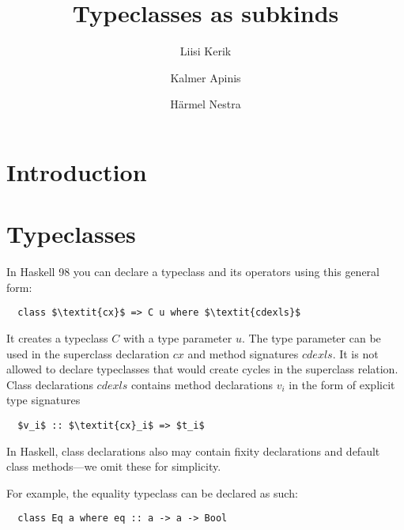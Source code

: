 \documentclass[runningheads]{llncs}
\begin{document}
%
\title{Typeclasses as subkinds}
%
\author{Liisi Kerik%
\and  Kalmer Apinis
\and  Härmel Nestra
}
%
%
%
\maketitle             
%
\begin{abstract}
\end{abstract}
%
%
\section{Introduction}
\section{Typeclasses}

In Haskell 98\cite{jones1999report} you can declare a typeclass and its operators using this general form:
\begin{lstlisting}
  class $\textit{cx}$ => C u where $\textit{cdexls}$ 
\end{lstlisting}
It creates a typeclass $C$ with a type parameter $u$. The type parameter can be used in the superclass declaration $\textit{cx}$ and method signatures $\textit{cdexls}$. It is not allowed to declare typeclasses that would create cycles in the superclass relation. Class declarations $\textit{cdexls}$ contains method declarations $v_i$ in the form of explicit type signatures
\begin{lstlisting}
  $v_i$ :: $\textit{cx}_i$ => $t_i$
\end{lstlisting}
In Haskell, class declarations also may contain fixity declarations and default class methods---we omit these for simplicity.

For example, the equality typeclass can be declared as such:
\begin{lstlisting}
  class Eq a where eq :: a -> a -> Bool
\end{lstlisting}
\end{document}
